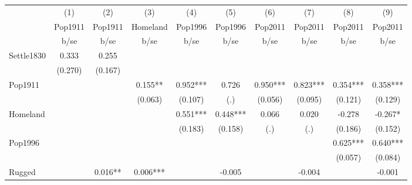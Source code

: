 {
\def\sym#1{\ifmmode^{#1}\else\(^{#1}\)\fi}
\begin{tabular}{l*{9}{c}}
\hline\hline
                    &\multicolumn{1}{c}{(1)}&\multicolumn{1}{c}{(2)}&\multicolumn{1}{c}{(3)}&\multicolumn{1}{c}{(4)}&\multicolumn{1}{c}{(5)}&\multicolumn{1}{c}{(6)}&\multicolumn{1}{c}{(7)}&\multicolumn{1}{c}{(8)}&\multicolumn{1}{c}{(9)}\\
                    &\multicolumn{1}{c}{Pop1911}&\multicolumn{1}{c}{Pop1911}&\multicolumn{1}{c}{Homeland}&\multicolumn{1}{c}{Pop1996}&\multicolumn{1}{c}{Pop1996}&\multicolumn{1}{c}{Pop2011}&\multicolumn{1}{c}{Pop2011}&\multicolumn{1}{c}{Pop2011}&\multicolumn{1}{c}{Pop2011}\\
                    &        b/se   &        b/se   &        b/se   &        b/se   &        b/se   &        b/se   &        b/se   &        b/se   &        b/se   \\
\hline
Settle1830          &       0.333   &       0.255   &               &               &               &               &               &               &               \\
                    &     (0.270)   &     (0.167)   &               &               &               &               &               &               &               \\
Pop1911             &               &               &       0.155** &       0.952***&       0.726   &       0.950***&       0.823***&       0.354***&       0.358***\\
                    &               &               &     (0.063)   &     (0.107)   &         (.)   &     (0.056)   &     (0.095)   &     (0.121)   &     (0.129)   \\
Homeland            &               &               &               &       0.551***&       0.448***&       0.066   &       0.020   &      -0.278   &      -0.267*  \\
                    &               &               &               &     (0.183)   &     (0.158)   &         (.)   &         (.)   &     (0.186)   &     (0.152)   \\
Pop1996             &               &               &               &               &               &               &               &       0.625***&       0.640***\\
                    &               &               &               &               &               &               &               &     (0.057)   &     (0.084)   \\
Rugged              &               &       0.016** &       0.006***&               &      -0.005   &               &      -0.004   &               &      -0.001   \\

\end{tabular}}
